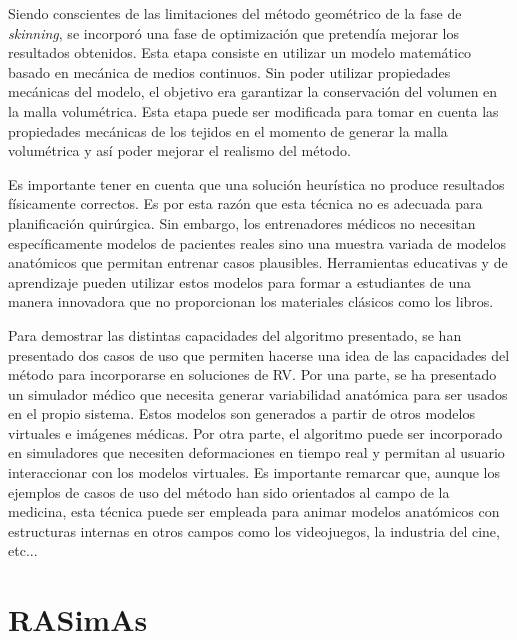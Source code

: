 Siendo conscientes de las limitaciones del método geométrico de la fase de \emph{skinning}, se incorporó una fase de optimización que pretendía mejorar los resultados obtenidos. Esta etapa consiste en utilizar un modelo matemático basado en mecánica de medios continuos. Sin poder utilizar propiedades mecánicas  del modelo, el objetivo era garantizar la conservación del volumen en la malla volumétrica. Esta etapa puede ser modificada para tomar en cuenta las propiedades mecánicas de los tejidos en el momento de generar la malla volumétrica y así poder mejorar el realismo del método.


Es importante tener en cuenta que una solución heurística no produce resultados físicamente correctos. Es por esta razón que esta técnica no es adecuada para planificación quirúrgica. Sin embargo, los entrenadores médicos no necesitan específicamente modelos de pacientes reales sino una muestra variada de modelos anatómicos que permitan entrenar casos plausibles. Herramientas educativas y de aprendizaje pueden utilizar estos modelos para formar a estudiantes de una manera innovadora que no proporcionan los materiales clásicos como los libros.





Para demostrar las distintas capacidades del algoritmo presentado, se han presentado dos casos de uso que permiten hacerse una idea de las capacidades del método para incorporarse en soluciones de \ac{RV}. Por una parte, se ha presentado un simulador médico que necesita generar variabilidad anatómica para ser usados en el propio sistema. Estos modelos son generados a partir de otros modelos virtuales e imágenes médicas. Por otra parte, el algoritmo puede ser incorporado en simuladores que necesiten deformaciones en tiempo real y permitan al usuario interaccionar con los modelos virtuales.
Es importante remarcar que, aunque los ejemplos de casos de uso del método han sido orientados al campo de la medicina, esta técnica puede ser empleada para animar modelos anatómicos con estructuras internas en otros campos como los videojuegos, la industria del cine, etc...
 

\section{RASimAs}



